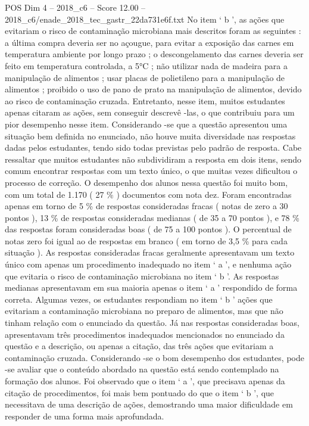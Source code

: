 \begin{textsample}{POS Dim 4 – 2018\_c6 – Score 12.00 – 2018\_c6/enade\_2018\_tec\_gastr\_22da731e6f.txt}
No item ‘ b ’, as ações que evitariam o risco de contaminação microbiana mais descritos foram as seguintes : a última compra deveria ser no açougue, para evitar a exposição das carnes em temperatura ambiente por longo prazo ; o descongelamento das carnes deveria ser feito em temperatura controlada, a 5{\EmojiFont °}C ; não utilizar nada de madeira para a manipulação de alimentos ; usar placas de polietileno para a manipulação de alimentos ; proibido o uso de pano de prato na manipulação de alimentos, devido ao risco de contaminação cruzada.
Entretanto, nesse item, muitos estudantes apenas citaram as ações, sem conseguir descrevê -las, o que contribuiu para um pior desempenho nesse item.
Considerando -se que a questão apresentou uma situação bem definida no enunciado, não houve muita diversidade nas respostas dadas pelos estudantes, tendo sido todas previstas pelo padrão de resposta.
Cabe ressaltar que muitos estudantes não subdividiram a resposta em dois itens, sendo comum encontrar respostas com um texto único, o que muitas vezes dificultou o processo de correção.
O desempenho dos alunos nessa questão foi muito bom, com um total de 1.170 ( 27 \% ) documentos com nota dez.
Foram encontradas apenas em torno de 5 \% de respostas consideradas fracas ( notas de zero a 30 pontos ), 13 \% de respostas consideradas medianas ( de 35 a 70 pontos ), e 78 \% das respostas foram consideradas boas ( de 75 a 100 pontos ).
O percentual de notas zero foi igual ao de respostas em branco ( em torno de 3,5 \% para cada situação ).
As respostas consideradas fracas geralmente apresentavam um texto único com apenas um procedimento inadequado no item ‘ a ’, e nenhuma ação que evitaria o risco de contaminação microbiana no item ‘ b ’.
As respostas medianas apresentavam em sua maioria apenas o item ‘ a ’ respondido de forma correta.
Algumas vezes, os estudantes respondiam no item ‘ b ’ ações que evitariam a contaminação microbiana no preparo de alimentos, mas que não tinham relação com o enunciado da questão.
Já nas respostas consideradas boas, apresentavam três procedimentos inadequados mencionados no enunciado da questão e a descrição, ou apenas a citação, das três ações que evitariam a contaminação cruzada.
Considerando -se o bom desempenho dos estudantes, pode -se avaliar que o conteúdo abordado na questão está sendo contemplado na formação dos alunos.
Foi observado que o item ‘ a ’, que precisava apenas da citação de procedimentos, foi mais bem pontuado do que o item ‘ b ’, que necessitava de uma descrição de ações, demostrando uma maior dificuldade em responder de uma forma mais aprofundada.

\end{textsample}
